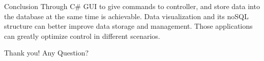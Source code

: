\documentclass[11pt]{beamer}
\begin{document}
\begin{frame}{Conclusion}
  Through C\# GUI to give commands to controller, and store data into the database at the same time is achievable. Data visualization and its noSQL structure can better improve data storage and management. Those applications can greatly optimize control in different scenarios.
\end{frame}

\begin{frame}
  \centering
  \LARGE
  Thank you! Any Question?
\end{frame}
\end{document}
